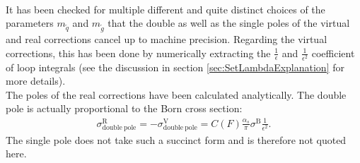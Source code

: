 \\
It has been checked for multiple different and quite distinct choices of the parameters $m_{\tilde{q}}$ and $m_{\tilde{g}}$ that the double as well as the single poles of the virtual and real corrections cancel up to machine precision. Regarding the virtual corrections, this has been done by numerically extracting the $\frac{1}{\epsilon}$ and $\frac{1}{\epsilon^2}$ coefficient of loop integrals (see the discussion in section \ref{sec:SetLambdaExplanation} for more details).\\
The poles of the real corrections have been calculated analytically. The double pole is actually proportional to the Born cross section:
\begin{align}
\sigma^{\mathrm{R}}_{\mathrm{double\ pole}} = -\sigma^{\mathrm{V}}_{\mathrm{double\ pole}} = C(F)\frac{\alpha_s}{\pi}\sigma^{\mathrm{B}} \frac{1}{\epsilon^2}.
\end{align}
The single pole does not take such a succinct form and is therefore not quoted here.

